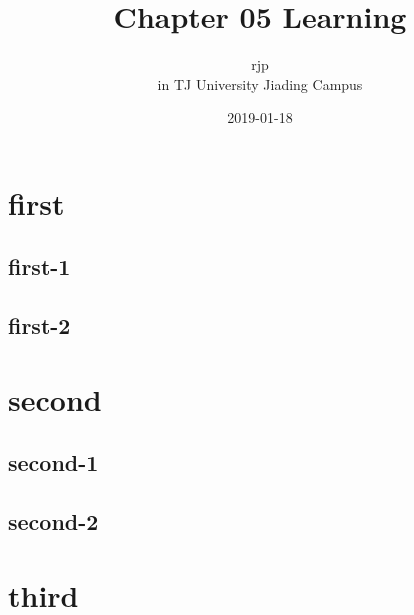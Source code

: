 \documentclass[a4paper, UTF8]{article}
\begin{document}
\title{Chapter 05 Learning}
\author{
    rjp \\[0.5cm]
    in TJ University Jiading Campus
}
\date{2019-01-18}
\maketitle

\tableofcontents
{}
\listoffigures
{}

\section{first}
\subsection{first-1}
\subsection{first-2}    
\newpage

\section{second}
\subsection{second-1}
\subsection{second-2}
\newpage

\section{third}
\end{document}

